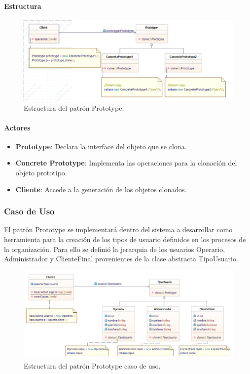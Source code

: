 \paragraph{Estructura}

\begin{figure}[th!]
	\centering
	\includegraphics[width=.7\linewidth]{imagenes/Patrones/Prototype.pdf}
	\caption{Estructura del patrón Prototype.\cite{gof}}	
\end{figure}

\paragraph{Actores}

\begin{itemize}
	\item \textbf{Prototype}: Declara la interface del objeto que se clona.
	\item \textbf{Concrete Prototype}: Implementa las operaciones para la clonación del objeto prototipo.
	\item \textbf{Cliente}: Accede a la generación de los objetos clonados.
\end{itemize}


\subsubsection{Caso de Uso}
El patrón Prototype se implementará dentro del sistema a desarrollar como herramienta para la creación de los tipos de usuario definidos en los procesos de la organización. Para ello se definió la jerarquia de los usuarios Operario, Administrador y ClienteFinal provenientes de la clase abstracta TipoUsuario.

\begin{figure}[th!]
	\centering
	\includegraphics[width=.7\linewidth]{imagenes/Patrones/Prototype_caso.pdf}
	\caption{Estructura del patrón Prototype caso de uso.\cite{gof}}	
\end{figure}

